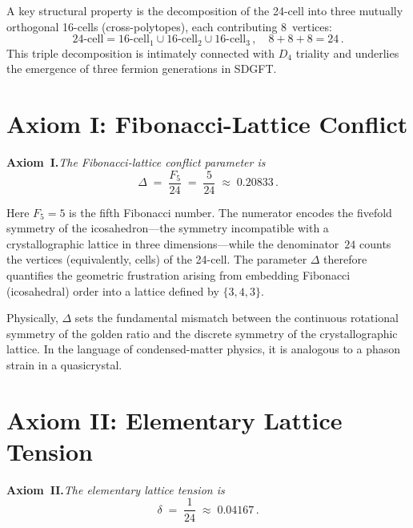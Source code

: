 \documentclass[amsmath,amssymb,aps,prd,twocolumn,superscriptaddress,nofootinbib]{revtex4-2}
\begin{document}
A key structural property is the decomposition of the 24-cell into three
mutually orthogonal 16-cells (cross-polytopes), each contributing 8~vertices:
\begin{equation}\label{eq:decomp}
  24\text{-cell} = 16\text{-cell}_1 \cup 16\text{-cell}_2
                  \cup 16\text{-cell}_3\,,
  \quad 8+8+8=24\,.
\end{equation}
This triple decomposition is intimately connected with $D_4$ triality and
underlies the emergence of three fermion generations in SDGFT.

\section{Axiom I: Fibonacci-Lattice Conflict}\label{sec:axiom1}

\noindent\textbf{Axiom~I.}\quad\emph{The Fibonacci-lattice conflict parameter is}
\begin{equation}\label{eq:Delta}
  \boxed{\;\Delta \;=\; \frac{F_5}{24} \;=\; \frac{5}{24}\;\approx\; 0.20833\,.\;}
\end{equation}

Here $F_5 = 5$ is the fifth Fibonacci number.  The numerator encodes the
fivefold symmetry of the icosahedron---the symmetry incompatible with a
crystallographic lattice in three dimensions---while the denominator~$24$
counts the vertices (equivalently, cells) of the 24-cell.  The parameter
$\Delta$ therefore quantifies the geometric frustration arising from embedding
Fibonacci (icosahedral) order into a lattice defined by $\{3,4,3\}$.

Physically, $\Delta$ sets the fundamental mismatch between the continuous
rotational symmetry of the golden ratio and the discrete symmetry of the
crystallographic lattice.  In the language of condensed-matter physics, it is
analogous to a phason strain in a quasicrystal.

\section{Axiom II: Elementary Lattice Tension}\label{sec:axiom2}

\noindent\textbf{Axiom~II.}\quad\emph{The elementary lattice tension is}
\begin{equation}\label{eq:delta}
  \boxed{\;\delta \;=\; \frac{1}{24}\;\approx\; 0.04167\,.\;}
\end{equation}
\end{document}
